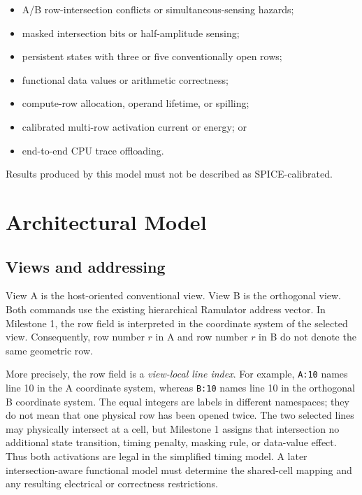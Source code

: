 \documentclass[9pt,twocolumn]{extarticle}
\newcommand{\cmd}[1]{\texttt{#1}}
\newcommand{\viewA}{\textsf{A}}
\newcommand{\viewB}{\textsf{B}}
\begin{document}
\begin{itemize}
  \item A/B row-intersection conflicts or simultaneous-sensing hazards;
  \item masked intersection bits or half-amplitude sensing;
  \item persistent states with three or five conventionally open rows;
  \item functional data values or arithmetic correctness;
  \item compute-row allocation, operand lifetime, or spilling;
  \item calibrated multi-row activation current or energy; or
  \item end-to-end CPU trace offloading.
\end{itemize}

Results produced by this model must not be described as SPICE-calibrated.

\section{Architectural Model}

\subsection{Views and addressing}

View \viewA{} is the host-oriented conventional view. View \viewB{} is the
orthogonal view. Both commands use the existing hierarchical Ramulator address
vector. In Milestone 1, the row field is interpreted in the coordinate system
of the selected view. Consequently, row number $r$ in \viewA{} and row number
$r$ in \viewB{} do not denote the same geometric row.

More precisely, the row field is a \emph{view-local line index}. For example,
\cmd{A:10} names line 10 in the \viewA{} coordinate system, whereas
\cmd{B:10} names line 10 in the orthogonal \viewB{} coordinate system. The
equal integers are labels in different namespaces; they do not mean that one
physical row has been opened twice. The two selected lines may physically
intersect at a cell, but Milestone 1 assigns that intersection no additional
state transition, timing penalty, masking rule, or data-value effect. Thus
both activations are legal in the simplified timing model. A later
intersection-aware functional model must determine the shared-cell mapping and
any resulting electrical or correctness restrictions.
\end{document}
